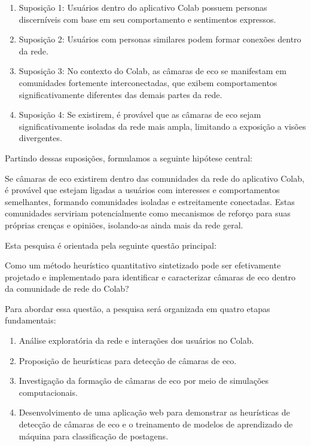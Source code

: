 \begin{enumerate}
    \item Suposição 1: Usuários dentro do aplicativo Colab possuem personas discerníveis com base em seu comportamento e sentimentos expressos.
    \item Suposição 2: Usuários com personas similares podem formar conexões dentro da rede.
    \item Suposição 3: No contexto do Colab, as câmaras de eco se manifestam em comunidades fortemente interconectadas, que exibem comportamentos significativamente diferentes das demais partes da rede.
    \item Suposição 4: Se existirem, é provável que as câmaras de eco sejam significativamente isoladas da rede mais ampla, limitando a exposição a visões divergentes.
\end{enumerate}

Partindo dessas suposições, formulamos a seguinte hipótese central:

\begin{citacao}
Se câmaras de eco existirem dentro das comunidades da rede do aplicativo Colab, é provável que estejam ligadas a usuários com interesses e comportamentos semelhantes, formando comunidades isoladas e estreitamente conectadas. Estas comunidades serviriam potencialmente como mecanismos de reforço para suas próprias crenças e opiniões, isolando-as ainda mais da rede geral.
\end{citacao}

Esta pesquisa é orientada pela seguinte questão principal:

\begin{citacao}
    Como um método heurístico quantitativo sintetizado pode ser efetivamente projetado e implementado para identificar e caracterizar câmaras de eco dentro da comunidade de rede do Colab?
\end{citacao}

Para abordar essa questão, a pesquisa será organizada em quatro etapas fundamentais:

\begin{enumerate}
    \item Análise exploratória da rede e interações dos usuários no Colab.
    \item Proposição de heurísticas para detecção de câmaras de eco.
    \item Investigação da formação de câmaras de eco por meio de simulações computacionais.
    \item Desenvolvimento de uma aplicação web para demonstrar as heurísticas de detecção de câmaras de eco e o treinamento de modelos de aprendizado de máquina para classificação de postagens.
  \end{enumerate}

